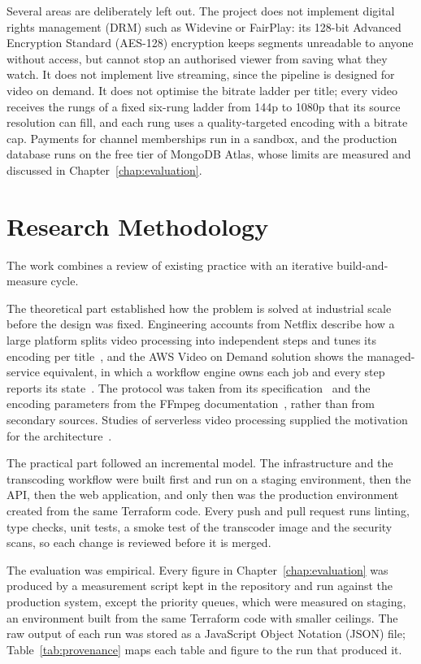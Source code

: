 Several areas are deliberately left out. The project does not implement digital rights management (DRM)
such as Widevine or FairPlay: its 128-bit Advanced Encryption Standard (AES-128) encryption keeps segments unreadable to anyone without
access, but cannot stop an authorised viewer from saving what they watch. It does not implement live
streaming, since the pipeline is designed for video on demand. It does not optimise the bitrate
ladder per title; every video receives the rungs of a fixed six-rung ladder from 144p to 1080p that
its source resolution can fill, and each rung uses a quality-targeted encoding with a bitrate cap.
Payments for channel memberships run in a sandbox, and the production database runs on the free
tier of MongoDB Atlas, whose limits are measured and discussed in Chapter~\ref{chap:evaluation}.

\section{Research Methodology}
\label{sec:methodology}

The work combines a review of existing practice with an iterative build-and-measure cycle.

The theoretical part established how the problem is solved at industrial scale before the design
was fixed. Engineering accounts from Netflix describe how a large platform splits video processing
into independent steps and tunes its encoding per title~\cite{netflix2024microservices,
netflix2015pertitle}, and the AWS Video on Demand solution shows the managed-service equivalent,
in which a workflow engine owns each job and every step reports its state~\cite{awsvod}. The
protocol was taken from its specification~\cite{rfc8216} and the encoding parameters from the
FFmpeg documentation~\cite{ffmpegdocs}, rather than from secondary sources. Studies of serverless
video processing supplied the motivation for the architecture~\cite{grid2023serverless,
nossdav2019video}.

The practical part followed an incremental model. The infrastructure and the transcoding workflow
were built first and run on a staging environment, then the API, then the web application, and
only then was the production environment created from the same Terraform code. Every push and pull
request runs linting, type checks, unit tests, a smoke test of the transcoder image and the security
scans, so each change is reviewed before it is merged.

The evaluation was empirical. Every figure in Chapter~\ref{chap:evaluation} was produced by a
measurement script kept in the repository and run against the production system, except the
priority queues, which were measured on staging, an environment built from the same Terraform code
with smaller ceilings. The raw output of each run was stored as a JavaScript Object Notation (JSON) file;
Table~\ref{tab:provenance} maps each table and figure to the run that produced it.

